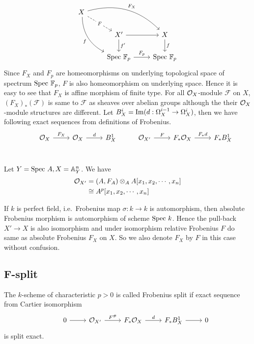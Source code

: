 \documentclass[11pt,a4paper]{scmsnotes}
\begin{document}
\begin{equation}
\begin{tikzcd}
X \arrow[rrd, "F_X", bend left] \arrow[rd, "F" description, dashed] \arrow[rdd, "f"', bend right] &  &  \\
& X' \arrow[d,"f'"] \arrow[r] & X \arrow[d, "f"] \\
& \spec \mathbb{F}_p \arrow[r, "F_p"] & \spec \mathbb{F}_p
\end{tikzcd}
\end{equation}
Since $F_X$ and $F_p$ are homeomorphisms on underlying topological space of spectrum $\text{Spec } \mathbb{F}_p$, $F$ is also homeomorphism on underlying space. Hence it is easy to see that $F_X$ is affine morphism of finite type. For all $\mathcal{O}_{X}$-module $\mathcal{F}$ on $X$, $(F_X)_*(\mathcal{F})$ is same to $\mathcal{F}$ as sheaves over abelian groups although the their $\mathcal{O}_{X}$-module structures are different. 
Let $B^i_X= \operatorname*{Im} (d: \Omega^{i-1}_X \to \Omega^{i}_X)$, then we have following exact sequences from definitions of Frobenius.
\begin{equation}
	\begin{tikzcd}
		 &\sheaf{X} \arrow[r, "F_X"] &\sheaf{X} \arrow[r,"d"] &B^1_X\\
	\end{tikzcd}
	\begin{tikzcd}
	&\sheaf{X'} \arrow[r,"F"]&F_*\sheaf{X} \arrow[r,"F_*d"]& F_* B^1_X\\
	\end{tikzcd}
\end{equation}
\begin{ex}
	Let $Y= \text{Spec } A , X = \mathbb{A}^n_Y$. We have
	\[ 
	\begin{aligned}
		\mathcal{O}_{X'}&= (A,F_A) \otimes_A A[x_1, x_2, \cdots,x_n] \\
				&\cong A^p[x_1,x_2,\cdots,x_n]
	\end{aligned}
	\]
\end{ex}
If $k$ is perfect field, i.e.\ Frobenius map $\sigma: k \to k$ is automorphism, then absolute Frobenius morphism is automorphism of scheme $\text{Spec } k$. Hence the pull-back $X' \to X$ is also isomorphism and under isomorphism relative Frobenius $F$ do same as absolute Frobenius $F_X$ on $X$. So we also denote $F_X$ by $F$ in this case without confusion.
\subsection{F-split}
\begin{secdefn}
	The $k$-scheme of characteristic $p>0$ is called Frobenius split if exact sequence from Cartier isomorphism
	\begin{equation}
		\begin{tikzcd}
		\label{exact1}
		& 0 \arrow[r]& \sheaf{X'} \arrow[r,"F^{\#}"] &F_* \sheaf{X} \arrow[r,"d"] & F_* B_X^1\arrow[r]& 0
		\end{tikzcd}
	\end{equation}
	is split exact.
\end{secdefn}
\end{document}
